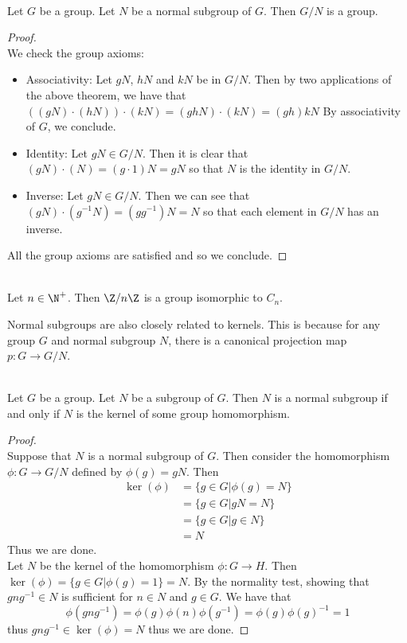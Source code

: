 \documentclass[a4paper]{article}
\begin{document}
\begin{prp}{}{}\\
Let $G$ be a group. Let $N$ be a normal subgroup of $G$. Then $G/N$ is a group. 
\begin{proof}\\
We check the group axioms: 
\begin{itemize}
\item Associativity: Let $gN$, $hN$ and $kN$ be in $G/N$. Then by two applications of the above theorem, we have that $((gN)\cdot(hN))\cdot(kN)=(ghN)\cdot(kN)=(gh)kN$ By associativity of $G$, we conclude. 
\item Identity: Let $gN\in G/N$. Then it is clear that $(gN)\cdot(N)=(g\cdot 1)N=gN$ so that $N$ is the identity in $G/N$. 
\item Inverse: Let $gN\in G/N$. Then we can see that $(gN)\cdot(g^{-1}N)=(gg^{-1})N=N$ so that each element in $G/N$ has an inverse. 
\end{itemize}
All the group axioms are satisfied and so we conclude. 
\end{proof}
\end{prp}

\begin{eg}{}{}\\
Let $n\in\N^+$. Then $\Z/n\Z$ is a group isomorphic to $C_n$. 
\end{eg}

Normal subgroups are also closely related to kernels. This is because for any group $G$ and normal subgroup $N$, there is a canonical projection map $p:G\to G/N$. 

\begin{prp}{}{}\\
Let $G$ be a group. Let $N$ be a subgroup of $G$. Then $N$ is a normal subgroup if and only if $N$ is the kernel of some group homomorphism. 
\begin{proof}\\
Suppose that $N$ is a normal subgroup of $G$. Then consider the homomorphism $\phi:G\to G/N$ defined by $\phi(g)=gN$. Then
\begin{align*}
\ker(\phi)&=\{g\in G|\phi(g)=N\}\\
&=\{g\in G|gN=N\}\\
&=\{g\in G|g\in N\}\\
&=N
\end{align*} Thus we are done. \\

Let $N$ be the kernel of the homomorphism $\phi:G\to H$. Then $\ker(\phi)=\{g\in G|\phi(g)=1\}=N$. By the normality test, showing that $gng^{-1}\in N$ is sufficient for $n\in N$ and $g\in G$. We have that $$\phi(gng^{-1})=\phi(g)\phi(n)\phi(g^{-1})=\phi(g)\phi(g)^{-1}=1$$ thus $gng^{-1}\in\ker(\phi)=N$ thus we are done. 
\end{proof}
\end{prp}
\end{document}
